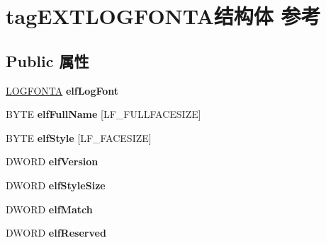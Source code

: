 \hypertarget{structtag_e_x_t_l_o_g_f_o_n_t_a}{}\section{tag\+E\+X\+T\+L\+O\+G\+F\+O\+N\+T\+A结构体 参考}
\label{structtag_e_x_t_l_o_g_f_o_n_t_a}
\subsection*{Public 属性}
\begin{DoxyCompactItemize}
\item 
\mbox{\label{structtag_e_x_t_l_o_g_f_o_n_t_a_a28074c54f4fe75c8a9f006ec9803fd71}} 
\hyperlink{struct_l_o_g_f_o_n_t_a}{L\+O\+G\+F\+O\+N\+TA} {\bfseries elf\+Log\+Font}
\item 
\mbox{\label{structtag_e_x_t_l_o_g_f_o_n_t_a_a5f678fcb3a8fde921615da90562853a6}} 
B\+Y\+TE {\bfseries elf\+Full\+Name} \mbox{[}L\+F\+\_\+\+F\+U\+L\+L\+F\+A\+C\+E\+S\+I\+ZE\mbox{]}
\item 
\mbox{\label{structtag_e_x_t_l_o_g_f_o_n_t_a_a9ffae58579838e4c24a23414cd3d33fc}} 
B\+Y\+TE {\bfseries elf\+Style} \mbox{[}L\+F\+\_\+\+F\+A\+C\+E\+S\+I\+ZE\mbox{]}
\item 
\mbox{\label{structtag_e_x_t_l_o_g_f_o_n_t_a_a62df771af80dbad22c20381b2bf26a82}} 
D\+W\+O\+RD {\bfseries elf\+Version}
\item 
\mbox{\label{structtag_e_x_t_l_o_g_f_o_n_t_a_ae90c8bf422220469a4837d533ab36d09}} 
D\+W\+O\+RD {\bfseries elf\+Style\+Size}
\item 
\mbox{\label{structtag_e_x_t_l_o_g_f_o_n_t_a_a29e74735147c11e4911568ddf9fbeefd}} 
D\+W\+O\+RD {\bfseries elf\+Match}
\item 
\mbox{\label{structtag_e_x_t_l_o_g_f_o_n_t_a_aaf4ee7fdc15194a560dcfdf63ccc7611}} 
D\+W\+O\+RD {\bfseries elf\+Reserved}
\item 
\mbox{\label{structtag_e_x_t_l_o_g_f_o_n_t_a_ae87b382c87e9b4c3e212e087577df5f9}} 

\end{DoxyCompactItemize}
